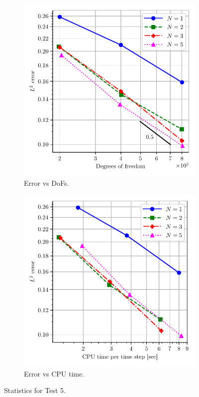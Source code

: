 \documentclass[a4paper,11pt,oneside]{article}
\begin{document}
\begin{figure}[htbp]
	\centering
	\begin{subfigure}{0.5\linewidth}
		\includegraphics[width=\linewidth]{figures/riemann_1d/test1-5/error_vs_dof_chandrashekhar.pdf}
		\caption{Error vs DoFs.}
		\label{subfig:test1-5_error_vs_dof_chandrashekhar}
	\end{subfigure}%
	\begin{subfigure}{0.5\linewidth}
		\includegraphics[width=\linewidth]{figures/riemann_1d/test1-5/error_vs_cputime_chandrashekhar.pdf}
		\caption{Error vs CPU time.}
		\label{subfig:test1-5_error_vs_cputime_chandrashekhar}
	\end{subfigure}
	\caption{Statistics for Test 5.}
	\label{fig:test1-5_error_plots_chandrashekhar}
\end{figure}
\end{document}
